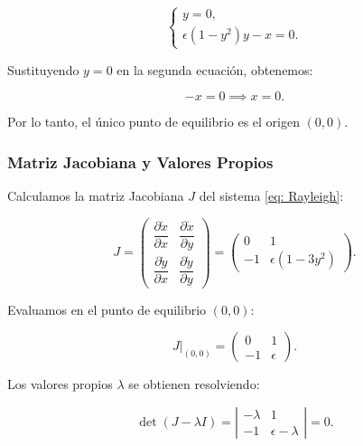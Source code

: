 \begin{equation}
    \begin{cases}
        y = 0, \\
        \epsilon \left(1 - y^2\right) y - x = 0.
    \end{cases}
\end{equation}

Sustituyendo \( y = 0 \) en la segunda ecuación, obtenemos:

\begin{equation}
    - x = 0 \implies x = 0.
\end{equation}

Por lo tanto, el único punto de equilibrio es el origen \((0, 0)\).

\subsubsection{Matriz Jacobiana y Valores Propios}

Calculamos la matriz Jacobiana \( J \) del sistema \eqref{eq: Rayleigh}:

\begin{equation}
    J =
    \begin{pmatrix}
        \dfrac{\partial \dot{x}}{\partial x} & \dfrac{\partial \dot{x}}{\partial y} \\
        \dfrac{\partial \dot{y}}{\partial x} & \dfrac{\partial \dot{y}}{\partial y}
    \end{pmatrix}
    =
    \begin{pmatrix}
        0 & 1 \\
        -1 & \epsilon \left(1 - 3 y^2\right)
    \end{pmatrix}.
\end{equation}

Evaluamos en el punto de equilibrio \((0, 0)\):

\begin{equation}
    J|_{(0,0)} =
    \begin{pmatrix}
        0 & 1 \\
        -1 & \epsilon
    \end{pmatrix}.
\end{equation}

Los valores propios \(\lambda\) se obtienen resolviendo:

\begin{equation}
    \det(J - \lambda I) = \left| \begin{array}{cc}
        -\lambda & 1 \\
        -1 & \epsilon - \lambda
    \end{array} \right| = 0.
\end{equation}

